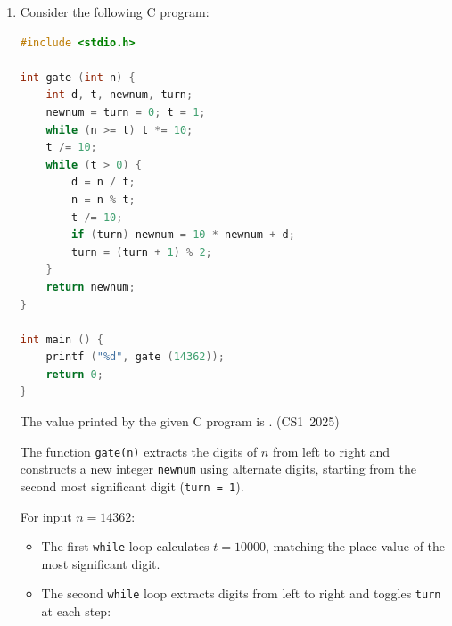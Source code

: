 \begin{enumerate}[label=\thesubsection.\arabic*, ref=\thesubsection.\theenumi]
\begin{lstlisting}[language=C]
int main () {
    ptr1 = L1; ptr2 = L2;
    while (ptr1->next != NULL) {
        query = ptr1->next->data;
        if (find (query, L2))
            ptr1->next = ptr1->next->next;
        else
            ptr1 = ptr1->next;
    }
    return 0;
}
\end{lstlisting}

\vspace{0.2cm}
\solution
The code deletes every element in L1 (from $2^{\text{nd}}$ node onward) that appears in L2. Elements $12, 9, 11, 15$ are deleted from L1. Retained elements are $[1, 7, 3, 5, 8]$, leaving 5 nodes in total.

The following code can verify the solution:
\begin{lstlisting}[frame=single, basicstyle=\rmfamily, escapeinside={(*@}{@*)}]
(*@\makebox[\dimexpr\linewidth-2\fboxsep-2\fboxrule\relax][c]{codes/q25.c}@*)
\end{lstlisting}

\vspace{0.5cm}
\item Consider the following C program:
\begin{lstlisting}[language=C]
#include <stdio.h>

int gate (int n) {
    int d, t, newnum, turn;
    newnum = turn = 0; t = 1;
    while (n >= t) t *= 10;
    t /= 10;
    while (t > 0) {
        d = n / t;
        n = n % t;
        t /= 10;
        if (turn) newnum = 10 * newnum + d;
        turn = (turn + 1) % 2;
    }
    return newnum;
}

int main () {
    printf ("%d", gate (14362));
    return 0;
}
\end{lstlisting}
The value printed by the given C program is \underline{\hspace{1cm}}.
\hfill (CS1~2025)

\vspace{0.2cm}
\solution
The function \texttt{gate(n)} extracts the digits of $n$ from left to right and constructs a new integer \texttt{newnum} using alternate digits, starting from the second most significant digit (\texttt{turn = 1}).

For input $n = 14362$:
\begin{itemize}
    \item The first \texttt{while} loop calculates $t = 10000$, matching the place value of the most significant digit.
    \item The second \texttt{while} loop extracts digits from left to right and toggles \texttt{turn} at each step:
\end{itemize}


\end{enumerate}
